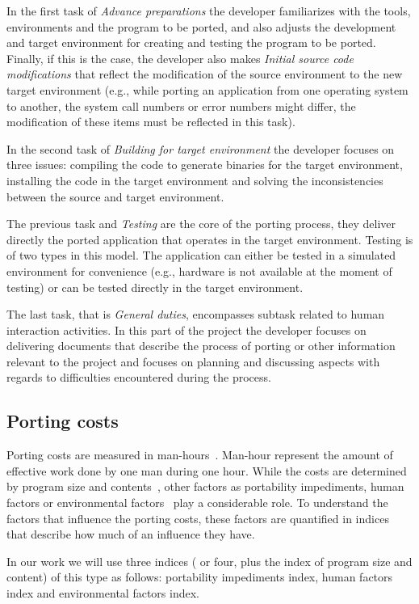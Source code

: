 In the first task of \textit{Advance preparations} the developer 
familiarizes with the tools, environments and the program to be ported, and 
also adjusts the development and target environment for creating and testing the
program to be ported. Finally, if this is the case, the developer also makes
\textit{Initial source code modifications} that reflect the modification of
the source environment to the new target environment (e.g., while porting an
application from one operating system to another, the system call numbers or
error numbers might differ, the modification of these items must be reflected
in this task).

In the second task of \textit{Building for target environment} the developer
focuses on three issues: compiling the code to generate binaries for the
target environment, installing the code in the target environment and solving
the inconsistencies between the source and target environment.

The previous task and \textit{Testing} are the core of the porting process, they
deliver directly the ported application that operates in the target environment.
Testing is of two types in this model. The application can either be tested in a
simulated environment for convenience (e.g., hardware is not available at the
moment of testing) or can be tested directly in the target environment.

The last task, that is \textit{General duties}, encompasses subtask related to
human interaction activities. In this part of the project the developer focuses
on delivering documents that describe the process of porting or other
information relevant to the project and focuses on planning and discussing
aspects with regards to difficulties encountered during the process.

\subsection{Porting costs}

Porting costs are measured in man-hours~\cite{b1, b2}. Man-hour represent the
amount of effective work done by one man during one hour. While the costs are
determined by program size and contents~\cite{b2}, other factors as portability
impediments, human factors or environmental factors~\cite{b2} play a
considerable role. To understand the factors that influence the porting costs,
these factors are quantified in indices that describe how much of an influence
they have.

In our work we will use three indices ({\color{red} or four, plus the index of
program size and content}) of this type as follows: portability impediments
index, human factors index and environmental factors index.

